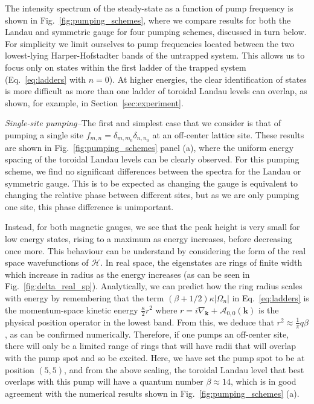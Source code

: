 The intensity spectrum of the steady-state as a function of pump
frequency is shown in Fig.~\ref{fig:pumping_schemes}, where we compare
results for both the Landau and symmetric gauge for four pumping
schemes, discussed in turn below. For simplicity we limit ourselves to
pump frequencies located between the two lowest-lying
Harper-Hofstadter bands of the untrapped system. This allows us to
focus only on states within the first ladder of the trapped system
(Eq.~\eqref{eq:ladders} with $n = 0$). At higher energies, the clear
identification of states is more difficult as more than one ladder of
toroidal Landau levels can overlap, as shown, for example, in
Section~\ref{sec:experiment}.

{\em{Single-site pumping--}}The first and simplest case that we
consider is that of pumping a single site $f_{m,n} = \delta_{m,m_0}
\delta_{n,n_0}$ at an off-center lattice site. These results are shown
in Fig.~\ref{fig:pumping_schemes} panel (a), where the uniform energy
spacing of the toroidal Landau levels can be clearly observed. For
this pumping scheme, we find no significant differences between the
spectra for the Landau or symmetric gauge. This is to be expected as
changing the gauge is equivalent to changing the relative phase
between different sites, but as we are only pumping one site, this
phase difference is unimportant.

Instead, for both magnetic gauges, we see that the peak height is very
small for low energy states, rising to a maximum as energy increases,
before decreasing once more. This behaviour can be understand by
considering the form of the real space wavefunctions of $\mathcal{H}$.
In real space, the eigenstates are rings of finite width which
increase in radius as the energy increases (as can be seen in
Fig.~\ref{fig:delta_real_sp}). Analytically, we can predict how the
ring radius scales with energy by remembering that the term
$(\beta + 1/2) \kappa |\Omega_n|$ in Eq.~\eqref{eq:ladders} is the
momentum-space kinetic energy $\frac{\kappa}{2}r^2$ where
$r = i\nabla_{\mathbf{k}} + \mathcal{A}_{0, 0}(\mathbf{k})$ is the
physical position operator in the lowest band. From this, we deduce
that $r^2 \approx \frac{1}{\pi} q \beta$, as can be confirmed
numerically. Therefore, if one pumps an off-center site, there will
only be a limited range of rings that will have radii that will
overlap with the pump spot and so be excited. Here, we have set the
pump spot to be at position $(5,5)$, and from the above scaling, the
toroidal Landau level that best overlaps with this pump will have a
quantum number $\beta \approx 14$, which is in good agreement with the
numerical results shown in Fig.~\ref{fig:pumping_schemes} (a).

